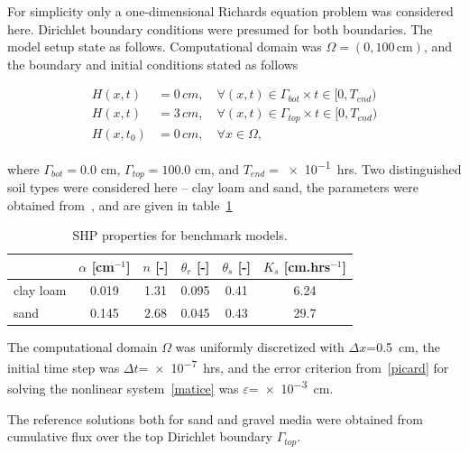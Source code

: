 \documentclass[review]{elsarticle}
\newenvironment{lineq}
    {\begin{linenomath*}
    \begin{equation}
    }
    { 
    \end{equation} 
    \end{linenomath*}
    }
\begin{document}
 For simplicity only a one-dimensional Richards equation problem was considered here.  Dirichlet boundary conditions were presumed for both boundaries. The model setup state as follows. Computational domain was $\Omega=(0,100\,\mathrm{cm})$, and the boundary and initial conditions stated as follows
 \begin{lineq}
 \begin{split}
 H(x,t) &= 0\, cm, \quad \forall (x,t) \in \Gamma_{bot} \times  t \in [0, T_{end}) \\ 
  H(x,t) &= 3\, cm, \quad \forall (x,t) \in \Gamma_{top} \times  t \in [0, T_{end}) \\ 
  H(x,t_0) &= 0\, cm , \quad \forall x \in \Omega,
  \end{split}
\end{lineq}
 where $\Gamma_{bot}=0.0$ cm, $\Gamma_{top}=100.0$ cm, and $T_{end}=$\num{e-1}~hrs. Two distinguished soil types were considered here -- clay loam and sand, the parameters were obtained from~\citep{retc}, and are given in table~\ref{tab:bench}
 
 \begin{table}[ht]
 \begin{center}
 \caption{SHP properties for benchmark models.}
 \begin{small}
 \begin{tabular}{l||c c c c c}
  & $\alpha$  [cm$^{-1}$] & $n$ [-] & $\theta_r$ [-] & $\theta_s$  [-]  &  $K_s$ [cm.hrs$^{-1}$]  \\ \hline
 clay loam & 0.019 & 1.31 & 0.095 & 0.41 & 6.24 \\ 
 sand &  0.145 & 2.68 & 0.045 & 0.43 & 29.7 \\ \hline
 \end{tabular}
 \end{small}
 \label{tab:bench}
 \end{center}
 \end{table}
 
 
  The computational domain $\Omega$ was uniformly discretized with $\Delta x$=0.5~cm, the initial time step was $\Delta t$=\num{e-7}~hrs, and the error criterion from~\eqref{picard} for solving the nonlinear system~\eqref{matice} was   $\varepsilon$=\num{e-3}~cm.
 
 The reference solutions both for sand and gravel media were obtained from  cumulative flux over the top Dirichlet boundary $\Gamma_{top}$.
 
\end{document}
